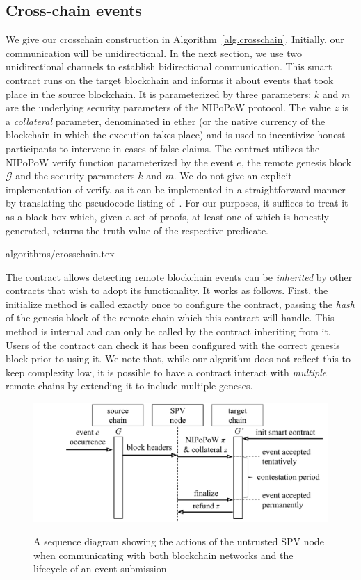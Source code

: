 \subsection*{Cross-chain events}

We give our \textsf{crosschain} construction in Algorithm~\ref{alg.crosschain}.
Initially, our communication will be unidirectional. In the next section, we
use two unidirectional channels to establish bidirectional communication. This
smart contract runs on the target blockchain and informs it about events that
took place in the source blockchain. It is parameterized by three parameters:
$k$ and $m$ are the underlying security parameters of the NIPoPoW protocol. The
value $z$ is a \emph{collateral} parameter, denominated in ether (or the native
currency of the blockchain in which the execution takes place) and is used to
incentivize honest participants to intervene in cases of false claims. The
contract utilizes the NIPoPoW \textsf{verify} function parameterized by the
event $e$, the remote genesis block $\mathcal{G}$ and the security parameters
$k$ and $m$. We do not give an explicit implementation of \textsf{verify}, as it
can be implemented in a straightforward manner by translating the pseudocode
listing of~\cite{nipopows}. For our purposes, it suffices to treat it as a black
box which, given a set of proofs, at least one of which is honestly generated,
returns the truth value of the respective predicate.

{algorithms/crosschain.tex}

The contract allows detecting remote blockchain events can be \emph{inherited}
by other contracts that wish to adopt its functionality. It works as follows.
First, the \textsf{initialize} method is called exactly once to configure the
contract, passing the \emph{hash} of the genesis block of the remote chain which
this contract will handle. This method is \textsf{internal} and can only be
called by the contract inheriting from it. Users of the contract can check  it
has been configured with the correct genesis block prior to using it. We note
that, while our algorithm does not reflect this to keep complexity low, it is
possible to have a contract interact with \emph{multiple} remote chains by
extending it to include multiple geneses.

\begin{figure}[H]
    \caption{A sequence diagram showing the actions of the untrusted SPV node
             when communicating with both blockchain networks and the lifecycle
             of an event submission}
    \centering
    \includegraphics[width=0.9 \columnwidth,keepaspectratio]{figures/sequence-diagram.pdf}
    \label{fig.sequence}
\end{figure}

